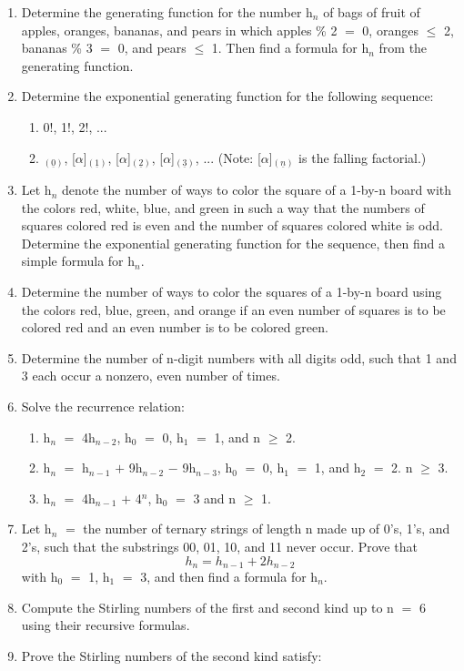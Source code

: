 \documentclass{article}
\newcommand{\mt}[1]{\ensuremath{#1}}
\newcommand{\balist}{\begin{enumerate}[label=\alph*.]}
\newcommand{\elist}{\end{enumerate}}
\newcommand{\ps}{\mt{+} }
\newcommand{\ms}{\mt{-} }
\newcommand{\lse}{\mt{\leq} }
\newcommand{\gre}{\mt{\geq} }
\newcommand{\eql}{\mt{=} }
\newcommand{\uw}[2]{#1\mt{_{#2}}}
\newcommand{\uf}[2]{#1\mt{^{#2}}}
\newcommand{\eqn}[1]{\[#1\]}
\newcommand{\ff}[2]{[\mt{#1}]\mt{_{(\underline{#2})}}}
\begin{document}
\begin{enumerate}
   \item Determine the generating function for the number \uw{h}{n} of bags of fruit of apples, oranges, bananas, and pears in which apples \% 2 \eql 0, oranges \lse 2, bananas \% 3 \eql 0, and pears \lse 1. Then find a formula for \uw{h}{n} from the generating function.
   \item Determine the exponential generating function for the following sequence:
   \balist
   \item 0!, 1!, 2!, ...
   \item \ff{\alpha}{0}, \ff{\alpha}{1}, \ff{\alpha}{2}, \ff{\alpha}{3}, ... (Note: \ff{\alpha}{n} is the falling factorial.)
   \elist
   \item Let \uw{h}{n} denote the number of ways to color the square of a 1-by-n board with the colors red, white, blue, and green in such a way that the numbers of squares colored red is even and the number of squares colored white is odd. Determine the exponential generating function for the sequence, then find a simple formula for \uw{h}{n}.
   \item Determine the number of ways to color the squares of a 1-by-n board using the colors red, blue, green, and orange if an even number of squares is to be colored red and an even number is to be colored green.
   \item Determine the number of n-digit numbers with all digits odd, such that 1 and 3 each occur a nonzero, even number of times.
   \item Solve the recurrence relation:
   \balist
   \item \uw{h}{n} \eql 4\uw{h}{n - 2}, \uw{h}{0} \eql 0, \uw{h}{1} \eql 1, and n \gre 2.
   \item \uw{h}{n} \eql \uw{h}{n - 1} \ps 9\uw{h}{n - 2} \ms 9\uw{h}{n - 3}, \uw{h}{0} \eql 0, \uw{h}{1} \eql 1, and \uw{h}{2} \eql 2. n \gre 3.
   \item \uw{h}{n} \eql 4\uw{h}{n - 1} \ps \uf{4}{n}, \uw{h}{0} \eql 3 and n \gre 1.
   \elist
   \item Let \uw{h}{n} \eql the number of ternary strings of length n made up of 0's, 1's, and 2's, such that the substrings 00, 01, 10, and 11 never occur. Prove that
   \eqn{h_n = h_{n - 1} + 2h_{n - 2}}
   with \uw{h}{0} \eql 1, \uw{h}{1} \eql 3, and then find a formula for \uw{h}{n}.
   \item Compute the Stirling numbers of the first and second kind up to n \eql 6 using their recursive formulas.
   \item Prove the Stirling numbers of the second kind satisfy:

\end{enumerate}
\end{document}
